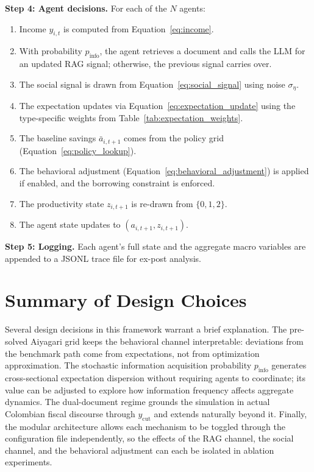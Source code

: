 \textbf{Step 4: Agent decisions.} For each of the $N$ agents:
\begin{enumerate}
    \item Income $y_{i,t}$ is computed from Equation~\eqref{eq:income}.
    \item With probability $p_{\text{info}}$, the agent retrieves a document and calls the LLM for an updated RAG signal; otherwise, the previous signal carries over.
    \item The social signal is drawn from Equation~\eqref{eq:social_signal} using noise $\sigma_\eta$.
    \item The expectation updates via Equation~\eqref{eq:expectation_update} using the type-specific weights from Table~\ref{tab:expectation_weights}.
    \item The baseline savings $\bar{a}_{i,t+1}$ comes from the policy grid (Equation~\eqref{eq:policy_lookup}).
    \item The behavioral adjustment (Equation~\eqref{eq:behavioral_adjustment}) is applied if enabled, and the borrowing constraint is enforced.
    \item The productivity state $z_{i,t+1}$ is re-drawn from $\{0, 1, 2\}$.
    \item The agent state updates to $(a_{i,t+1}, z_{i,t+1})$.
\end{enumerate}

\textbf{Step 5: Logging.} Each agent's full state and the aggregate macro variables are appended to a JSONL trace file for ex-post analysis.


\section{Summary of Design Choices}
\label{sec:design_choices}

Several design decisions in this framework warrant a brief explanation. The pre-solved Aiyagari grid keeps the behavioral channel interpretable: deviations from the benchmark path come from expectations, not from optimization approximation. The stochastic information acquisition probability $p_{\text{info}}$ generates cross-sectional expectation dispersion without requiring agents to coordinate; its value can be adjusted to explore how information frequency affects aggregate dynamics. The dual-document regime grounds the simulation in actual Colombian fiscal discourse through $y_{\text{cut}}$ and extends naturally beyond it. Finally, the modular architecture allows each mechanism to be toggled through the configuration file independently, so the effects of the RAG channel, the social channel, and the behavioral adjustment can each be isolated in ablation experiments.
